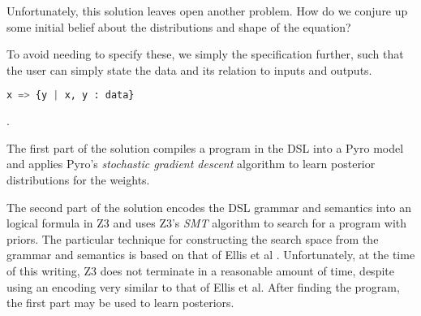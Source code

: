 \documentclass[runningheads]{llncs}
\begin{document}
Unfortunately, this solution leaves open another problem. How do we conjure up some 
initial belief about the distributions and shape of the equation? 

To avoid needing to specify these, we simply the specification further, such that the 
user can simply state the data and its relation to inputs and outputs. 

\begin{lstlisting}[language=Python]
x => {y | x, y : data}
\end{lstlisting}
.

The first part of the solution compiles a program in the DSL into a Pyro model and applies Pyro's 
\textit{stochastic gradient descent} algorithm \cite{} to learn posterior distributions for the weights. 

The second part of the solution encodes the DSL grammar and semantics into
an logical formula in Z3 \cite{} and uses Z3's \textit{SMT} \cite{} algorithm to search
for a program with priors.  
The particular technique for constructing the search space from the grammar and semantics 
is based on that of Ellis et al \cite{}.
Unfortunately, at the time of this writing, Z3 does not terminate in a reasonable amount of time, 
despite using an encoding very similar to that of Ellis et al. 
After finding the program, the first part may be used to learn posteriors. 
\end{document}
